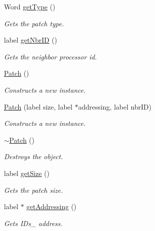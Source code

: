 \begin{DoxyCompactItemize}
Word \hyperlink{classHSF_1_1Patch_ae4f0f1deddb67c117a07175c20854506}{getType} ()
\begin{DoxyCompactList}\small\item\em Gets the patch type. \item\end{DoxyCompactList}\item 
label \hyperlink{classHSF_1_1Patch_ab3cc0b6c67fc04242ce059e4b2121352}{getNbrID} ()
\begin{DoxyCompactList}\small\item\em Gets the neighbor processor id. \item\end{DoxyCompactList}\item 
\hyperlink{classHSF_1_1Patch_a8bbb4ee433e8b808809e1de6ccc4b06a}{Patch} ()
\begin{DoxyCompactList}\small\item\em Constructs a new instance. \item\end{DoxyCompactList}\item 
\hyperlink{classHSF_1_1Patch_a9a1d8945a0e699397820dc7c83dd706f}{Patch} (label size, label $\ast$addressing, label nbrID)
\begin{DoxyCompactList}\small\item\em Constructs a new instance. \item\end{DoxyCompactList}\item 
\hyperlink{classHSF_1_1Patch_ac4002381f5600d00ce48e8d2a1d979c4}{$\sim$Patch} ()
\begin{DoxyCompactList}\small\item\em Destroys the object. \item\end{DoxyCompactList}\item 
label \hyperlink{classHSF_1_1Patch_a2710e0b6ccba9c2a5462d77a83a077ba}{getSize} ()
\begin{DoxyCompactList}\small\item\em Gets the patch size. \item\end{DoxyCompactList}\item 
label $\ast$ \hyperlink{classHSF_1_1Patch_a77780024fa9be8ca1de644d4ac8c3478}{getAddressing} ()
\begin{DoxyCompactList}\small\item\em Gets IDs\_\- address. \item\end{DoxyCompactList}\item 

\end{DoxyCompactItemize}
